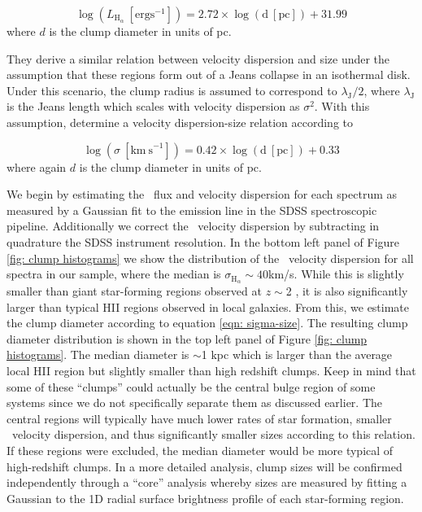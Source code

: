 \begin{equation}\label{eqn: luminsotiy-size}
\log(L_{\mathrm{H}_{\alpha}}\ [\mathrm{erg s}^{-1}]) = 2.72\times\log(\mathrm{d\ [pc]})+31.99
\end{equation}
where $d$ is the clump diameter in units of pc. 

They derive a similar relation between velocity dispersion and size under the assumption that these regions form out of a Jeans collapse in an isothermal disk. Under this scenario, the clump radius is assumed to correspond to $\lambda_{\mathrm{J}}/2$, where $\lambda_{\mathrm{J}}$ is the Jeans length which scales with velocity dispersion as $\sigma^2$. With this assumption, \cite{Wisnioski2012} determine a velocity dispersion-size relation according to

\begin{equation}\label{eqn: sigma-size}
\log(\sigma\ [\mathrm{km\ s}^{-1}]) = 0.42\times\log(\mathrm{d\ [pc]})+0.33
\end{equation}
where again $d$ is the clump diameter in units of pc.

We begin by estimating the \ha~flux and velocity dispersion for each spectrum as measured by a Gaussian fit to the emission line in the SDSS spectroscopic pipeline. Additionally we correct the \ha~velocity dispersion by subtracting in quadrature the SDSS instrument resolution. In the bottom left panel of Figure \ref{fig: clump histograms} we show the distribution of the \ha~velocity dispersion for all spectra in our sample, where the median is $\sigma_{\mathrm{H}_{\alpha}}\sim40$km/s. While this is slightly smaller than giant star-forming regions observed at $z\sim$2 \citep{Elmegreen2010,Sanchez2013}, it is also significantly larger than typical HII regions observed in local galaxies. From this, we estimate the clump diameter according to equation \ref{eqn: sigma-size}. The resulting clump diameter distribution is shown in the top left panel of Figure \ref{fig: clump histograms}. The median diameter is $\sim$1 kpc which is larger than the average local HII region but slightly smaller than high redshift clumps.  Keep in mind that some of these ``clumps'' could actually be the central bulge region of some systems since we do not specifically separate them as discussed earlier. The central regions will typically have much lower rates of star formation, smaller \ha~velocity dispersion, and thus significantly smaller sizes according to this relation. If these regions were excluded, the median diameter would be more typical of high-redshift clumps. In a more detailed analysis, clump sizes will be confirmed independently through a ``core'' analysis whereby sizes are measured by fitting a Gaussian to the 1D radial surface brightness profile of each star-forming region.  


